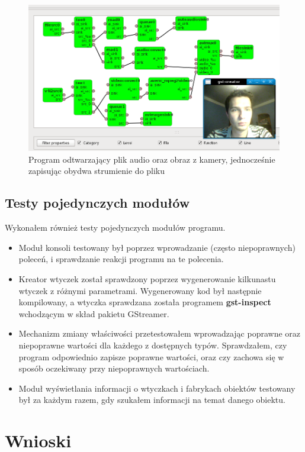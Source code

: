 \documentclass[12pt]{article}
\begin{document}
\begin{figure}[H]
  \includegraphics[width=160mm]{img/main-test-screen2.png}
  \caption{Program odtwarzający plik audio oraz obraz z kamery, jednocześnie zapisując obydwa strumienie do pliku}
  \label{fig:mainTestScreen2}
\end{figure}


\subsection{Testy pojedynczych modułów}
Wykonałem również testy pojedynczych modułów programu.
\begin{itemize}
  \setlength{\itemsep}{0em}
\item Moduł konsoli testowany był poprzez wprowadzanie (często niepoprawnych) poleceń, i sprawdzanie reakcji programu na te polecenia.
\item Kreator wtyczek został sprawdzony poprzez wygenerowanie kilkunastu wtyczek z różnymi parametrami. Wygenerowany kod był następnie kompilowany, a wtyczka sprawdzana została programem \textbf{gst-inspect} wchodzącym w skład pakietu GStreamer.
\item Mechanizm zmiany właściwości przetestowałem wprowadzając poprawne oraz niepoprawne wartości dla każdego z dostępnych typów. Sprawdzałem, czy program odpowiednio zapisze poprawne wartości, oraz czy zachowa się w sposób oczekiwany przy niepoprawnych wartościach.
\item Moduł wyświetlania informacji o wtyczkach i fabrykach obiektów testowany był za każdym razem, gdy szukałem informacji na temat danego obiektu.
\end{itemize}
\cleardoublepage
\section{Wnioski}
\end{document}
